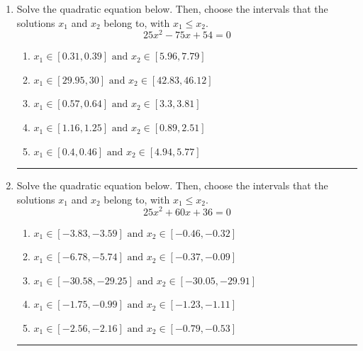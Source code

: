 \documentclass[14pt]{extbook}
\newcommand{\litem}[1]{\item#1\hspace*{-1cm}\rule{\textwidth}{0.4pt}}
\begin{document}
\begin{enumerate}
{\begin{enumerate}[label=\Alph*.]
\end{enumerate} }
\litem{
Solve the quadratic equation below. Then, choose the intervals that the solutions $x_1$ and $x_2$ belong to, with $x_1 \leq x_2$.\[ 25x^{2} -75 x + 54 = 0 \]\begin{enumerate}[label=\Alph*.]
\item \( x_1 \in [0.31, 0.39] \text{ and } x_2 \in [5.96, 7.79] \)
\item \( x_1 \in [29.95, 30] \text{ and } x_2 \in [42.83, 46.12] \)
\item \( x_1 \in [0.57, 0.64] \text{ and } x_2 \in [3.3, 3.81] \)
\item \( x_1 \in [1.16, 1.25] \text{ and } x_2 \in [0.89, 2.51] \)
\item \( x_1 \in [0.4, 0.46] \text{ and } x_2 \in [4.94, 5.77] \)

\end{enumerate} }
\litem{
Solve the quadratic equation below. Then, choose the intervals that the solutions $x_1$ and $x_2$ belong to, with $x_1 \leq x_2$.\[ 25x^{2} +60 x + 36 = 0 \]\begin{enumerate}[label=\Alph*.]
\item \( x_1 \in [-3.83, -3.59] \text{ and } x_2 \in [-0.46, -0.32] \)
\item \( x_1 \in [-6.78, -5.74] \text{ and } x_2 \in [-0.37, -0.09] \)
\item \( x_1 \in [-30.58, -29.25] \text{ and } x_2 \in [-30.05, -29.91] \)
\item \( x_1 \in [-1.75, -0.99] \text{ and } x_2 \in [-1.23, -1.11] \)
\item \( x_1 \in [-2.56, -2.16] \text{ and } x_2 \in [-0.79, -0.53] \)


\end{enumerate}}
\end{enumerate}
\end{document}
